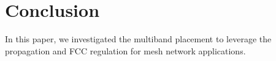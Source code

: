 \section{Conclusion}
\label{sec:conclusion}
In this paper, we investigated the multiband placement to leverage the propagation and FCC regulation for mesh network applications. 
